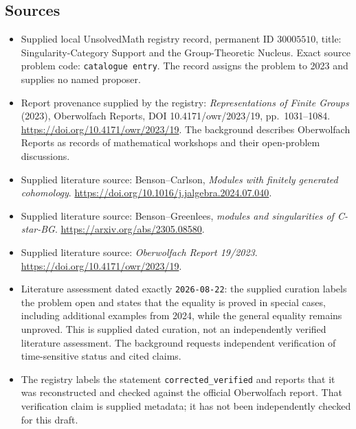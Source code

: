 \documentclass[11pt]{article}
\begin{document}
\subsection{Sources}
\begin{itemize}
\item Supplied local UnsolvedMath registry record, permanent ID \(30005510\), title: Singularity-Category Support and the Group-Theoretic Nucleus. Exact source problem code: \texttt{catalogue entry}. The record assigns the problem to 2023 and supplies no named proposer.
\item Report provenance supplied by the registry: \emph{Representations of Finite Groups} (2023), Oberwolfach Reports, DOI 10.4171/owr/2023/19, pp.\ 1031--1084. \url{https://doi.org/10.4171/owr/2023/19}. The background describes Oberwolfach Reports as records of mathematical workshops and their open-problem discussions.
\item Supplied literature source: Benson--Carlson, \emph{Modules with finitely generated cohomology}. \url{https://doi.org/10.1016/j.jalgebra.2024.07.040}.
\item Supplied literature source: Benson--Greenlees, \emph{modules and singularities of C-star-BG}. \url{https://arxiv.org/abs/2305.08580}.
\item Supplied literature source: \emph{Oberwolfach Report 19/2023}. \url{https://doi.org/10.4171/owr/2023/19}.
\item Literature assessment dated exactly \texttt{2026-08-22}: the supplied curation labels the problem open and states that the equality is proved in special cases, including additional examples from 2024, while the general equality remains unproved. This is supplied dated curation, not an independently verified literature assessment. The background requests independent verification of time-sensitive status and cited claims.
\item The registry labels the statement \texttt{corrected\_verified} and reports that it was reconstructed and checked against the official Oberwolfach report. That verification claim is supplied metadata; it has not been independently checked for this draft.
\end{itemize}
\end{document}
